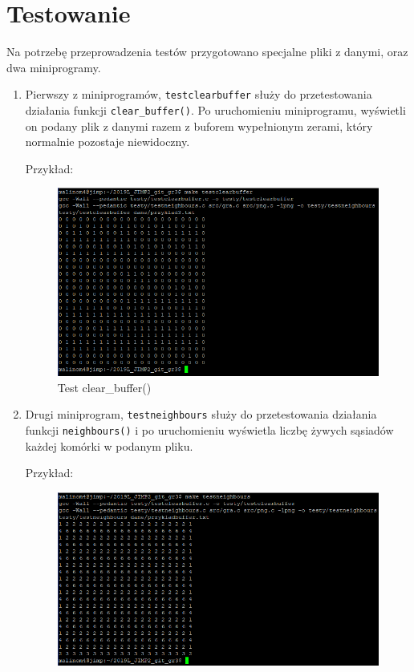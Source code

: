 \documentclass[12pt]{report}
\newcommand{\code}[1]{\texttt{#1}}
\begin{document}
\section{Testowanie}
\par Na potrzebę przeprowadzenia testów przygotowano specjalne pliki z danymi, oraz dwa miniprogramy. \par
\begin{enumerate}
\item Pierwszy z miniprogramów, \code{testclearbuffer} służy do przetestowania działania funkcji \code{clear\_buffer()}. Po uruchomieniu miniprogramu, wyświetli on podany plik z danymi razem z buforem wypełnionym zerami, który normalnie pozostaje niewidoczny.\par
Przykład:
\begin{figure}[H]
\centering
\includegraphics[width=14cm]{obrazy/testbuffer.png}
\caption{Test clear\_buffer()}
\label{test clear_buffer}
\end{figure}
\item Drugi miniprogram, \code{testneighbours} służy do przetestowania działania funkcji \code{neighbours()}  i po uruchomieniu wyświetla liczbę żywych sąsiadów każdej komórki w podanym pliku.\par
Przykład:
\begin{figure}[H]
\centering
\includegraphics[width=14cm]{obrazy/testneighbours.png}

\end{figure}
\end{enumerate}
\end{document}
